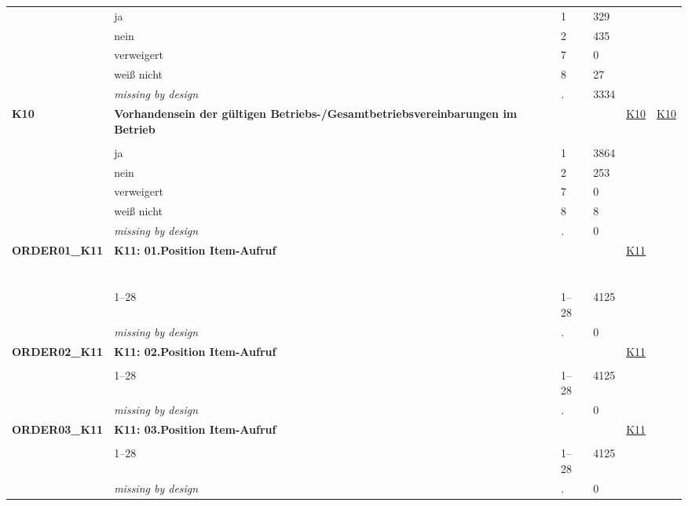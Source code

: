 \begin{longtable}{| L{2.45cm} | L{6cm} | C{1.5cm} | R{1cm} | C{2.25cm} | C{2.25cm} |}
   & ja & 1 & 329 &  &  \\ 
   & nein & 2 & 435 &  &  \\ 
   & verweigert & 7 & 0 &  &  \\ 
   & weiß nicht & 8 & 27 &  &  \\ 
   & \textit{missing by design} & \textit{.} & 3334 &  &  \\ 
   \midrule
\textbf{K10}\label{var:K10} & \textbf{Vorhandensein der gültigen Betriebs-/Gesamtbetriebsvereinbarungen im Betrieb} &  &  & \hyperref[K10]{K10} & \hyperref[var:suf:K10]{K10} \\ 
   &  &  &  &  &  \\ 
   & ja & 1 & 3864 &  &  \\ 
   & nein & 2 & 253 &  &  \\ 
   & verweigert & 7 & 0 &  &  \\ 
   & weiß nicht & 8 & 8 &  &  \\ 
   & \textit{missing by design} & \textit{.} & 0 &  &  \\ 
   \midrule
\textbf{ORDER01\_K11}\label{var:ORDER01:K11} & \textbf{K11: 01.Position Item-Aufruf} &  &  & \hyperref[K11]{K11} & \hyperref[var:suf:]{} \\ 
   & \protect\subsection[Variablen ORDER01\_K11 bis K12c]{} &  &  &  &  \\ 
   & 1--28 & 1--28 & 4125 &  &  \\ 
   & \textit{missing by design} & \textit{.} & 0 &  &  \\ 
   \midrule
\textbf{ORDER02\_K11}\label{var:ORDER02:K11} & \textbf{K11: 02.Position Item-Aufruf} &  &  & \hyperref[K11]{K11} & \hyperref[var:suf:]{} \\ 
   &  &  &  &  &  \\ 
   & 1--28 & 1--28 & 4125 &  &  \\ 
   & \textit{missing by design} & \textit{.} & 0 &  &  \\ 
   \midrule
\textbf{ORDER03\_K11}\label{var:ORDER03:K11} & \textbf{K11: 03.Position Item-Aufruf} &  &  & \hyperref[K11]{K11} & \hyperref[var:suf:]{} \\ 
   &  &  &  &  &  \\ 
   & 1--28 & 1--28 & 4125 &  &  \\ 
   & \textit{missing by design} & \textit{.} & 0 &  &  \\ 

\end{longtable}
